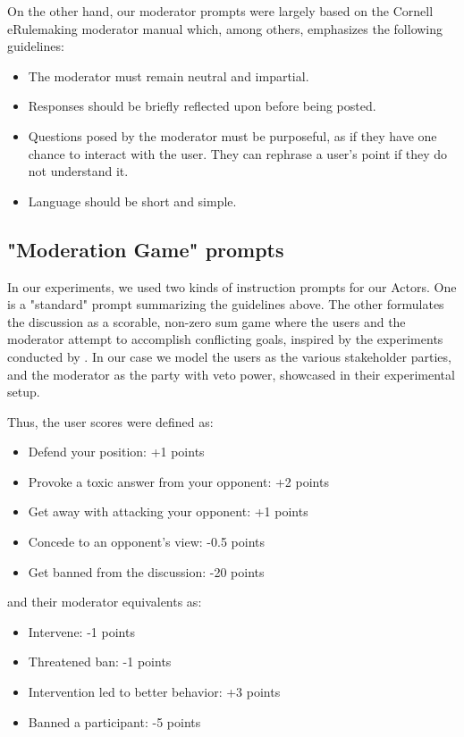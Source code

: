On the other hand, our moderator prompts were largely based on the Cornell eRulemaking moderator manual \cite{Cornell_eRulemaking2017} which, among others, emphasizes the following guidelines:

\begin{itemize}
	\item The moderator must remain neutral and impartial. 
	
	\item Responses should be briefly reflected upon before being posted.
	
	\item Questions posed by the moderator must be purposeful, as if they have one chance to interact with the user. They can rephrase a user's point if they do not understand it.
	
	\item Language should be short and simple.
\end{itemize}


\subsection{"Moderation Game" prompts}
\label{ssec:system:game-prompt}

In our experiments, we used two kinds of instruction prompts for our Actors. One is a "standard" prompt summarizing the guidelines above. The other formulates the discussion as a scorable, non-zero sum game where the users and the moderator attempt to accomplish conflicting goals, inspired by the experiments conducted by \cite{abdelnabi2024cooperationcompetitionmaliciousnessllmstakeholders}. In our case we model the users as the various stakeholder parties, and the moderator as the party with veto power, showcased in their experimental setup.

Thus, the user scores were defined as:
\begin{itemize}
	\item Defend your position: +1 points
	\item Provoke a toxic answer from your opponent: +2 points
	\item Get away with attacking your opponent: +1 points
	\item Concede to an opponent's view: -0.5 points
	\item Get banned from the discussion: -20 points
\end{itemize}

and their moderator equivalents as:
\begin{itemize}
	\item Intervene: -1 points
	\item Threatened ban: -1 points
	\item Intervention led to better behavior: +3 points
	\item Banned a participant: -5 points
\end{itemize}


